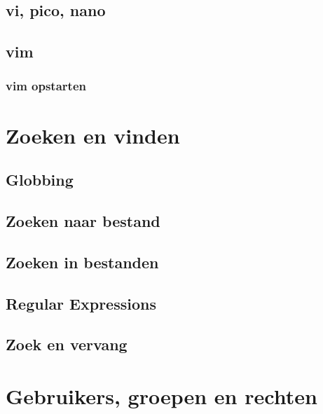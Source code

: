 \documentclass[a4paper,12pt,twoside,openright,titlepage]{book}
\begin{document}
\section{vi, pico, nano}

\section{vim}

\subsection{vim opstarten}






\chapter{Zoeken en vinden}\label{zoekenenvinden}

\section{Globbing}

\section{Zoeken naar bestand}


\section{Zoeken in bestanden}


\section{Regular Expressions}

\section{Zoek en vervang}


\chapter{Gebruikers, groepen en rechten}

\end{document}
